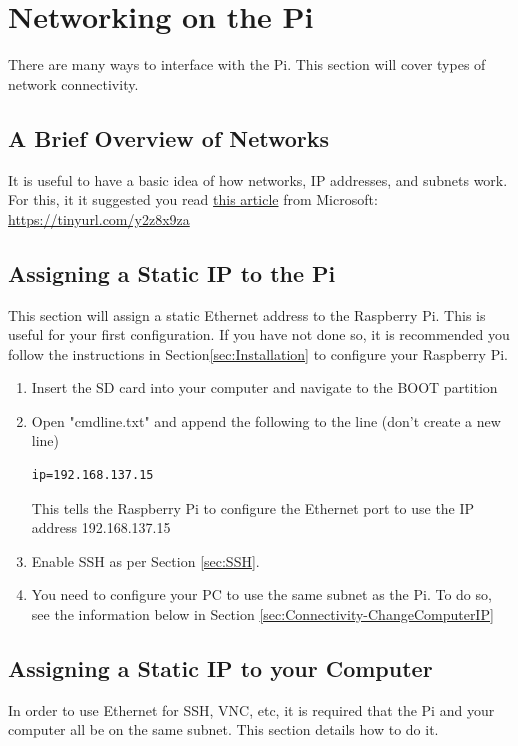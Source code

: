 \section{Networking on the Pi}
\label{sec:NetworkingOnThePi}
There are many ways to interface with the Pi. This section will cover types of network connectivity.

\subsection{A Brief Overview of Networks}
\label{app:UnderstandingNetworks}
It is useful to have a basic idea of how networks, IP addresses, and subnets work. For this, it it suggested you read \href{https://support.microsoft.com/en-za/help/164015/understanding-tcp-ip-addressing-and-subnetting-basics}{this article} from Microsoft: \href{https://tinyurl.com/y2z8x9za}{https://tinyurl.com/y2z8x9za}

\subsection{Assigning a Static IP to the Pi}
\label{sec:Connectivity-Ethernet}
This section will assign a static Ethernet address to the Raspberry Pi. This is useful for your first configuration. If you have not done so, it is recommended you follow the instructions in Section\ref{sec:Installation} to configure your Raspberry Pi.
\begin{enumerate}
    \item Insert the SD card into your computer and navigate to the BOOT partition
    \item Open "cmdline.txt" and append the following to the line (don't create a new line)
        \begin{lstlisting}[gobble=8]
        ip=192.168.137.15
        \end{lstlisting}
        This tells the Raspberry Pi to configure the Ethernet port to use the IP address 192.168.137.15
    \item Enable SSH as per Section \ref{sec:SSH}.
    \item You need to configure your PC to use the same subnet as the Pi. To do so, see the information below in Section \ref{sec:Connectivity-ChangeComputerIP}
\end{enumerate}

\subsection{Assigning a Static IP to your Computer}
In order to use Ethernet for SSH, VNC, etc, it is required that the Pi and your computer all be on the same subnet. This section details how to do it.
\label{sec:Connectivity-ChangeComputerIP}
